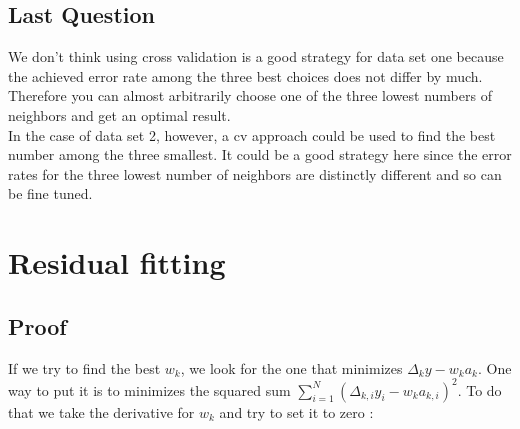 \documentclass{article}
\begin{document}
\subsection{Last Question}
We don't think using cross validation is a good strategy for data set one because the achieved error rate among the three best choices does not differ by much. Therefore you can almost arbitrarily choose one of the three lowest numbers of neighbors and get an optimal result. \\
In the case of data set 2, however, a cv approach could be used to find the best number among the three smallest. It could be a good strategy here since the error rates for the three lowest number of neighbors are distinctly different and so can be fine tuned. 

\section{Residual fitting}
\subsection{Proof}


If we try to find the best $w_k$, we look for the one that minimizes $\Delta_ky - w_k a_k$.
One way to put it is to minimizes the squared sum $\sum\limits_{i=1}^N ( \Delta_{k,i}y_i - w_k a_{k,i})^2$.
To do that we take the derivative for $w_k$ and try to set it to zero :
\end{document}
